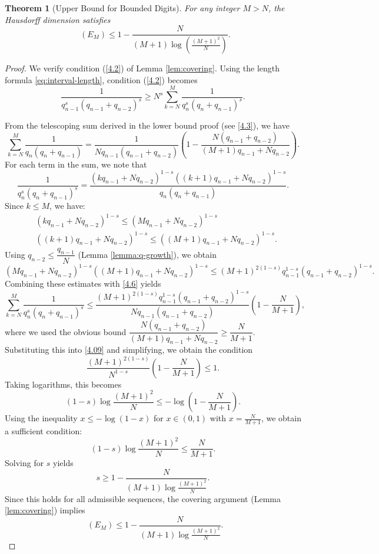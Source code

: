 \documentclass[12pt]{article}
\newtheorem{theorem}{Theorem}[section]
\numberwithin{equation}{section}
\DeclareMathOperator{\dimH}{dim_H}
\begin{document}
\begin{theorem}[Upper Bound for Bounded Digits] \label{thm:improved-upper}
For any integer $M > N$, the Hausdorff dimension satisfies
\[
\dimH(E_M) \leq 1 - \frac{N}{(M + 1)\log \left( \frac{(M+1)^2}{N} \right)}.
\]
\end{theorem}

\begin{proof}
We verify condition (\ref{4.2}) of Lemma \ref{lem:covering}. Using the length formula \eqref{eq:interval-length}, condition (\ref{4.2}) becomes
\begin{equation}
\frac{1}{q_{n-1}^s(q_{n-1}+q_{n-2})^s} \ge N^s \sum_{k=N}^{M} \frac{1}{q_n^s(q_n+q_{n-1})^s}. \label{4.09}
\end{equation}
%

{
From the telescoping sum derived in the lower bound proof (see \eqref{4.3}), we have
\begin{equation} \label{4.6}
\sum_{k=N}^{M} \frac{1}{q_n(q_n+q_{n-1})} = \frac{1}{Nq_{n-1}(q_{n-1}+q_{n-2})} \left(1 - \frac{N(q_{n-1}+q_{n-2})}{(M+1)q_{n-1}+Nq_{n-2}}\right).
\end{equation}
%
For each term in the sum, we note that
\[
\frac{1}{q_n^s(q_n+q_{n-1})^s} = \frac{(kq_{n-1}+Nq_{n-2})^{1-s}((k+1)q_{n-1}+Nq_{n-2})^{1-s}}{q_n(q_n+q_{n-1})}.
\]
%
Since $k \le M$, we have:
\begin{align*}
&(kq_{n-1}+Nq_{n-2})^{1-s} \le 
(Mq_{n-1}+Nq_{n-2})^{1-s} \\
&((k+1)q_{n-1}+Nq_{n-2})^{1-s}
\le ((M+1)q_{n-1}+Nq_{n-2})^{1-s}. 
\end{align*}
%
Using $q_{n-2} \le \dfrac{q_{n-1}}{N}$ (Lemma \ref{lemma:q-growth}), we obtain
\[
(Mq_{n-1}+Nq_{n-2})^{1-s}((M+1)q_{n-1}+Nq_{n-2})^{1-s} \le (M+1)^{2(1-s)} q_{n-1}^{1-s}(q_{n-1}+q_{n-2})^{1-s}.
\]
%
Combining these estimates with \eqref{4.6} yields
\[
\sum_{k=N}^{M} \frac{1}{q_n^s(q_n+q_{n-1})^s} \le \frac{(M+1)^{2(1-s)} q_{n-1}^{1-s}(q_{n-1}+q_{n-2})^{1-s}}{Nq_{n-1}(q_{n-1}+q_{n-2})} \left(1 - \frac{N}{M+1}\right),
\]
where we used the obvious bound $\dfrac{N(q_{n-1}+q_{n-2})}{(M+1)q_{n-1}+Nq_{n-2}} \ge \dfrac{N}{M+1}$.
%
Substituting this into \eqref{4.09} and simplifying, we obtain the condition
\[
\frac{(M+1)^{2(1-s)}}{N^{1-s}}\left(1 - \frac{N}{M+1}\right) \le 1.
\]
Taking logarithms, this becomes
\[
(1-s)\log\frac{(M+1)^2}{N} \le -\log\left(1 - \frac{N}{M+1}\right).
\]
%
Using the inequality $x \le -\log(1-x)$ for $x \in (0,1)$ with $x = \frac{N}{M+1}$, we obtain a sufficient condition:
\[
(1-s)\log\frac{(M+1)^2}{N} \le \frac{N}{M+1}.
\]
%
Solving for $s$ yields
\[
s \ge 1 - \frac{N}{(M+1)\log\frac{(M+1)^2}{N}}.
\]
%
Since this holds for all admissible sequences, the covering argument (Lemma \ref{lem:covering}) implies
\[
\dimH(E_M) \le 1 - \frac{N}{(M+1)\log\frac{(M+1)^2}{N}}.
\]
}
\end{proof}
\end{document}
